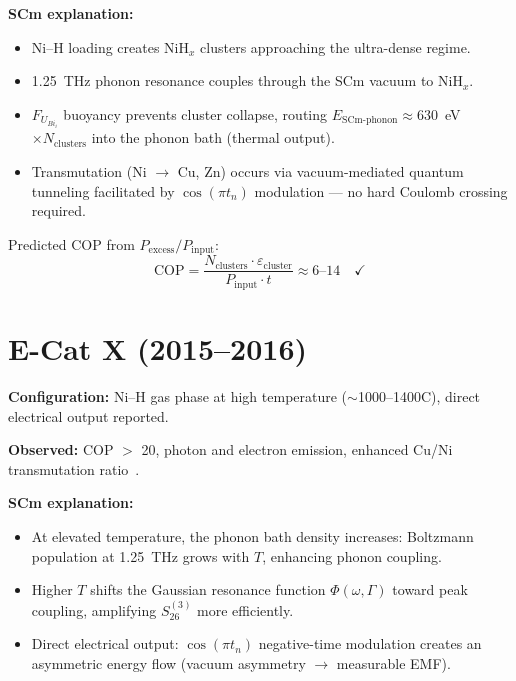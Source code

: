 \documentclass[11pt,a4paper]{article}
\begin{document}
\textbf{SCm explanation:}
\begin{itemize}
  \item Ni--H loading creates NiH$_x$ clusters approaching the ultra-dense regime.
  \item 1.25~THz phonon resonance couples through the SCm vacuum to NiH$_x$.
  \item $F_{U_{Bi_i}}$ buoyancy prevents cluster collapse, routing
        $E_{\text{SCm-phonon}}\approx630$~eV $\times N_{\text{clusters}}$
        into the phonon bath (thermal output).
  \item Transmutation (Ni $\to$ Cu, Zn) occurs via vacuum-mediated quantum
        tunneling facilitated by $\cos(\pi t_n)$ modulation --- no hard
        Coulomb crossing required.
\end{itemize}

Predicted COP from $P_{\text{excess}}/P_{\text{input}}$:
\begin{equation}\label{eq:cop_early}
\text{COP}=\frac{N_{\text{clusters}}\cdot\varepsilon_{\text{cluster}}}
            {P_{\text{input}}\cdot t}\approx6\text{--}14 \quad\checkmark
\end{equation}

\section{E-Cat X (2015--2016)}

\textbf{Configuration:} Ni--H gas phase at high temperature ($\sim$1000--1400\textdegree C),
direct electrical output reported.

\textbf{Observed:} COP $>$ 20, photon and electron emission, enhanced Cu/Ni
transmutation ratio~\cite{levi2014}.

\textbf{SCm explanation:}
\begin{itemize}
  \item At elevated temperature, the phonon bath density increases: Boltzmann
        population at 1.25~THz grows with $T$, enhancing phonon coupling.
  \item Higher $T$ shifts the Gaussian resonance function $\Phi(\omega,\Gamma)$
        toward peak coupling, amplifying $S_{26}^{(3)}$ more efficiently.
  \item Direct electrical output: $\cos(\pi t_n)$ negative-time modulation creates
        an asymmetric energy flow (vacuum asymmetry $\to$ measurable EMF).
\end{itemize}
\end{document}
